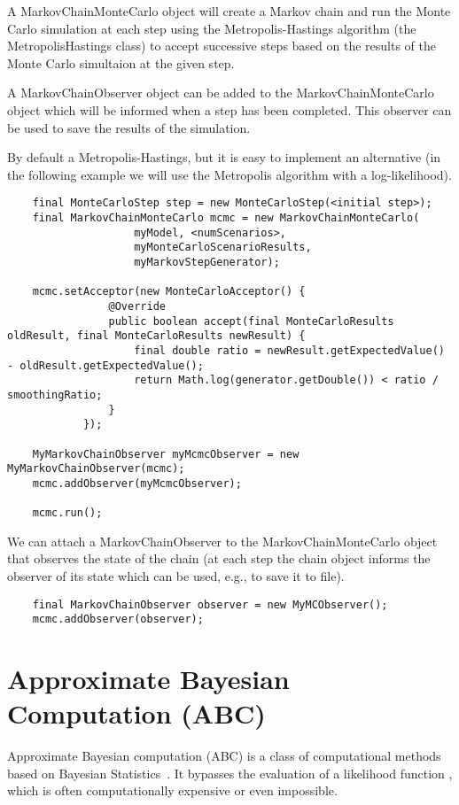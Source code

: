 A MarkovChainMonteCarlo object will create a Markov chain and run the Monte Carlo simulation at each step using the Metropolis-Hastings algorithm (the MetropolisHastings class) to accept successive steps based on the results of the Monte Carlo simultaion at the given step.

A MarkovChainObserver object can be added to the MarkovChainMonteCarlo object which will be informed when a step has been completed. This observer can be used to save the results of the simulation.

By default a Metropolis-Hastings, but it is easy to implement an alternative (in the following example we will use the Metropolis algorithm with a log-likelihood).

\begin{lstlisting}
    final MonteCarloStep step = new MonteCarloStep(<initial step>);
    final MarkovChainMonteCarlo mcmc = new MarkovChainMonteCarlo(
                    myModel, <numScenarios>,
                    myMonteCarloScenarioResults,
                    myMarkovStepGenerator);

    mcmc.setAcceptor(new MonteCarloAcceptor() {
                @Override
                public boolean accept(final MonteCarloResults oldResult, final MonteCarloResults newResult) {
                    final double ratio = newResult.getExpectedValue() - oldResult.getExpectedValue();
                    return Math.log(generator.getDouble()) < ratio / smoothingRatio;
                }
            });

    MyMarkovChainObserver myMcmcObserver = new MyMarkovChainObserver(mcmc);
    mcmc.addObserver(myMcmcObserver);

    mcmc.run();
\end{lstlisting}

We can attach a MarkovChainObserver to the MarkovChainMonteCarlo object that observes the state of the chain (at each step the chain object informs the observer of its state which can be used, e.g., to save it to file).

\begin{lstlisting}
    final MarkovChainObserver observer = new MyMCObserver();
    mcmc.addObserver(observer);
\end{lstlisting}

\section{Approximate Bayesian Computation (ABC)}
Approximate Bayesian computation (ABC) is a class of computational methods based on Bayesian Statistics~\cite{Toni2007,Marin2011,Marjoram2003,Wegmann2009}. It bypasses the evaluation of a likelihood function , which is often computationally expensive or even impossible.

